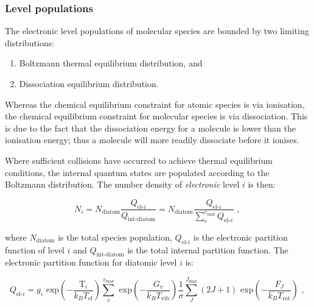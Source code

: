 \subsubsection{Level populations}


The electronic level populations of molecular species are bounded by two limiting distributions:

\begin{enumerate}
 \item Boltzmann thermal equilibrium distribution, and
 \item Dissociation equilibrium distribution.
\end{enumerate}

Whereas the chemical equilibrium constraint for atomic species is via ionisation, the chemical equilibrium constraint for molecular species is via dissociation.
This is due to the fact that the dissociation energy for a molecule is lower than the ionisation energy; thus a molecule will more readily dissociate before it ionises.  

\par

Where sufficient collisions have occurred to achieve thermal equilibrium conditions, the internal quantum states are populated according to the Boltzmann distribution.
The number density of \textit{electronic} level $i$ is then:

\begin{equation}
 N_i = N_\text{diatom} \frac{ Q_{\text{el-}i} }{ Q_\text{int-diatom} } = N_\text{diatom} \frac{ Q_{\text{el-}i} }{ \sum_e^{e_\text{max}} Q_{\text{el-}e} } \text{ , } \label{eq:diatom_boltz}
\end{equation}

\noindent where $N_\text{diatom}$ is the total species population, $Q_{\text{el-}i}$ is the electronic partition function of level $i$ and $Q_\text{int-diatom}$ is the total internal partition function.
The electronic partition function for diatomic level $i$ is:

\begin{equation}
 Q_{\text{el-}i} = g_{i} \text{~exp} \left ( - \frac{\mathrm{T}_{i}}{k_B T_\text{el}} \right ) \sum_{v}^{v_\text{max}} \text{~exp} \left ( - \frac{G_{v}}{k_B T_\text{vib}} \right ) \frac{1}{\sigma} \sum_{J}^{J_\text{max}} \left( 2J + 1 \right ) \text{~exp} \left ( - \frac{F_{J}}{k_B T_\text{rot}} \right ) \text{ , }
 \label{eq:Q_i-mol}
\end{equation}

